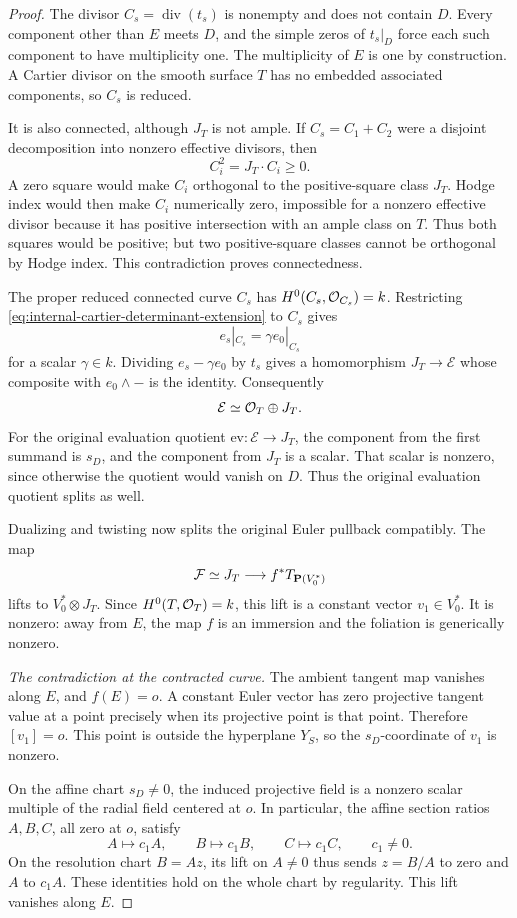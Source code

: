 \begin{proof}
The divisor $C_s=\operatorname{div}(t_s)$ is nonempty and does
not contain $D$. Every component other than $E$ meets $D$, and
the simple zeros of $t_s|_D$ force each such component to have
multiplicity one. The multiplicity of $E$ is one by construction.
A Cartier divisor on the smooth surface $T$ has no embedded
associated components, so $C_s$ is reduced.

It is also connected, although $J_T$ is not ample. If
$C_s=C_1+C_2$ were a disjoint decomposition into nonzero effective
divisors, then
\[
 C_i^2=J_T\cdot C_i\geq0.
\]
A zero square would make $C_i$ orthogonal to the positive-square
class $J_T$. Hodge index would then make $C_i$ numerically zero,
impossible for a nonzero effective divisor because it has positive
intersection with an ample class on $T$. Thus both squares would
be positive; but two positive-square classes cannot be orthogonal
by Hodge index. This contradiction proves connectedness.

The proper reduced connected curve $C_s$ has
$H^0(C_s,\mathcal O_{C_s})=k$. Restricting
\eqref{eq:internal-cartier-determinant-extension} to $C_s$ gives
\[
 e_s|_{C_s}=\gamma e_0|_{C_s}
\]
for a scalar $\gamma\in k$. Dividing $e_s-\gamma e_0$ by
$t_s$ gives a homomorphism $J_T\to\mathcal E$ whose composite
with $e_0\wedge-$ is the identity. Consequently
\[
 \mathcal E\simeq\mathcal O_T\oplus J_T.
\]
For the original evaluation quotient
$\mathrm{ev}:\mathcal E\to J_T$, the component from the first
summand is $s_D$, and the component from $J_T$ is a scalar.
That scalar is nonzero, since otherwise the quotient would
vanish on $D$. Thus the original evaluation quotient splits
as well.

Dualizing and twisting now splits the original Euler pullback
compatibly. The map
\[
 \mathcal F\simeq J_T\longrightarrow f^*T_{\mathbf P(V_0^*)}
\]
lifts to $V_0^*\otimes J_T$. Since $H^0(T,\mathcal O_T)=k$, this
lift is a constant vector $v_1\in V_0^*$. It is nonzero:
away from $E$, the map $f$ is an immersion and the foliation
is generically nonzero.

\emph{The contradiction at the contracted curve.}
The ambient tangent map vanishes along $E$, and $f(E)=o$.
A constant Euler vector has zero projective tangent value at
a point precisely when its projective point is that point.
Therefore $[v_1]=o$. This point is outside the hyperplane
$Y_S$, so the $s_D$-coordinate of $v_1$ is nonzero.

On the affine chart $s_D\ne0$, the induced projective field is
a nonzero scalar multiple of the radial field centered at $o$.
In particular, the affine section ratios $A,B,C$, all
zero at $o$, satisfy
\[
 A\longmapsto c_1A,\qquad
 B\longmapsto c_1B,\qquad
 C\longmapsto c_1C,
 \qquad c_1\ne0.
\]
On the resolution chart $B=Az$, its lift on $A\ne0$ thus sends
$z=B/A$ to zero and $A$ to $c_1A$. These identities hold on the
whole chart by regularity. This lift vanishes along $E$.


\end{proof}
